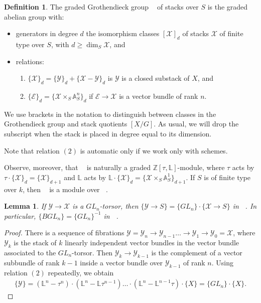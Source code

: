 \documentclass{amsart}
\newtheorem{lem}[thm]{Lemma}
\theoremstyle{definition}
\newtheorem{defn}[thm]{Definition}
\DeclareMathOperator{\Stk}{Stk}
\DeclareMathOperator{\Kstk}{K_0(\Stk_k^{\dim})}
\DeclareMathOperator{\KstkS}{K_0(\Stk_S^{\dim})}
\numberwithin{equation}{section}
\begin{document}
\begin{defn}\label{K0Stk defn}
The graded Grothendieck group $\KstkS$ of stacks over $S$ is the graded abelian group with:
\begin{itemize}
    \item generators in degree $d$ the isomorphism classes $[\mathscr{X}]_d$ of stacks $\mathscr{X}$ of finite type over $S$, with $d \geq \dim_S \mathscr{X}$, and
    \item relations:
        \begin{enumerate}
            \item $\{ \mathscr{X} \}_d = \{ \mathscr{Y} \}_d + \{ \mathscr{X}-\mathscr{Y} \}_d$ is $\mathscr{Y}$ is a closed substack of $X$, and
            \item $\{ \mathscr{E} \}_d = \{ \mathscr{X} \times_S \mathbb{A}^n_S \}_d$ if $\mathscr{E} \rightarrow \mathscr{X}$ is a vector bundle of rank $n$.
        \end{enumerate}
\end{itemize}
\end{defn}

We use brackets in the notation to distinguish between classes in the Grothendieck group and stack quotients $[X/G]$. As usual, we will drop the subscript when the stack is placed in degree equal to its dimension. 

Note that relation $(2)$ is automatic only if we work only with schemes.

Observe, moreover, that $\KstkS$ is naturally a graded $\mathbb{Z}[\tau, \mathbb{L}]$-module, where $\tau$ acts by $\tau \cdot \{ \mathscr{X} \}_d = \{ \mathscr{X} \}_{d+1}$ and $\mathbb{L}$ acts by  $\mathbb{L} \cdot \{ \mathscr{X} \}_d = \{ \mathscr{X} \times_S \mathbb{A}^1_S \}_{d+1}$. If $S$ is of finite type over $k$, then $\KstkS$ is a module over $\Kstk$.

 


\begin{lem}\label{GLn torsor}
If $\mathscr{Y} \rightarrow \mathscr{X}$ is a $GL_n$-torsor, then $\{ \mathscr{Y} \rightarrow S \} = \{ GL_n \} \cdot \{ \mathscr{X} \rightarrow S \}$ in $\KstkS$. In particular, $\{ BGL_n \} = \{ GL_n \}^{-1}$ in $\Kstk$.
\end{lem}

\begin{proof}
There is a sequence of fibrations $\mathscr{Y} = \mathscr{Y}_n \rightarrow \mathscr{Y}_{n-1} \ldots \rightarrow \mathscr{Y}_1 \rightarrow \mathscr{Y}_0 = \mathscr{X}$, where $\mathscr{Y}_k$ is the stack of $k$ linearly independent vector bundles in the vector bundle associated to the $GL_n$-torsor. Then $\mathscr{Y}_k \rightarrow \mathscr{Y}_{k-1}$ is the complement of a vector subbundle of rank $k-1$ inside a vector bundle over $\mathscr{Y}_{k-1}$ of rank $n$. Using relation $(2)$ repeatedly, we obtain
\begin{align*}
    \{ \mathscr{Y} \} = (\mathbb{L}^n - \tau^n) \cdot (\mathbb{L}^n - \mathbb{L} \tau^{n-1}) \ldots \cdot (\mathbb{L}^n - \mathbb{L}^{n-1} \tau) \cdot \{ X \} = \{ GL_n \} \cdot \{ X \}.
\end{align*}
\end{proof}
\end{document}
